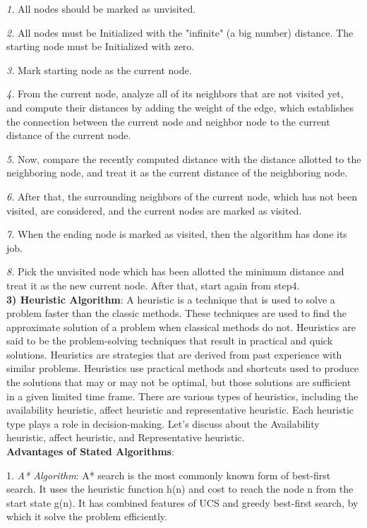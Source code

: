 \documentclass[12pt]{article}
\begin{document}
\textit{1.} All nodes should be marked as unvisited.

\textit{2.} All nodes must be Initialized with the "infinite" (a big number) distance. The starting node must be Initialized with zero.

\textit{3.} Mark starting node as the current node.

\textit{4.} From the current node, analyze all of its neighbors that are not visited yet, and compute their distances by adding the weight of the edge, which establishes the connection between
the current node and neighbor node to the current distance of the current node.

\textit{5.} Now, compare the recently computed distance with the distance allotted to the neighboring node, and treat it as the current distance of the neighboring node.

\textit{6.} After that, the surrounding neighbors of the current node, which has not been visited, are considered, and the current nodes are marked as visited.

\textit{7.} When the ending node is marked as visited, then the algorithm has done its job.

\textit{8.} Pick the unvisited node which has been allotted the minimum distance and treat it as the new current node. After that, start again from step4. \\

\textbf{3) Heuristic Algorithm}: A heuristic is a technique that is used to solve a problem faster than the classic methods. These techniques are used to find the
approximate solution of a problem when classical methods do not. Heuristics are said to be the problem-solving techniques that result in practical and quick solutions.
Heuristics are strategies that are derived from past experience with similar problems. Heuristics use practical methods and shortcuts used to produce the solutions that may or may not be
optimal, but those solutions are sufficient in a given limited time frame. There are various types of heuristics, including the availability heuristic, affect heuristic and representative heuristic. Each heuristic type plays a role in decision-making. Let's discuss about
the Availability heuristic, affect heuristic, and Representative heuristic. \\

\textbf{Advantages of Stated Algorithms}: 


1. \textit{A* Algorithm}: A* search is the most commonly known form of best-first search. It uses the heuristic function h(n) and cost to reach the node n from the start state g(n). It has combined features of UCS and
greedy best-first search, by which it solve the problem efficiently.
\end{document}
